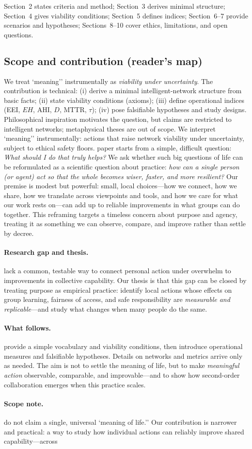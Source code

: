 \documentclass[12pt]{article}
\begin{document}
Section~2 states criteria and method; Section~3 derives minimal structure; Section~4 gives viability conditions; Section~5 defines indices; Section~6–7 provide scenarios and hypotheses; Sections~8–10 cover ethics, limitations, and open questions.\n \subsection*{Scope and contribution (reader's map)} We treat `meaning'' instrumentally as \emph{viability under uncertainty}. The contribution is technical: (i) derive a minimal intelligent-network structure from basic facts; (ii) state viability conditions (axioms); (iii) define operational indices (EEI, $EH$, AHI, $D$, MTTR, $\tau$); (iv) pose falsifiable hypotheses and study designs. Philosophical inspiration motivates the question, but claims are restricted to intelligent networks; metaphysical theses are out of scope. We interpret `meaning'' instrumentally: actions that raise network viability under uncertainty, subject to ethical safety floors. \nThis paper starts from a simple, difficult question: \emph{What should I do that truly helps?} We ask whether such big questions of life can be reformulated as a scientific question about practice: \emph{how can a single person (or agent) act so that the whole becomes wiser, faster, and more resilient?} Our premise is modest but powerful: small, local choices—how we connect, how we share, how we translate across viewpoints and tools, and how we care for what our work rests on—can add up to reliable improvements in what groups can do together. This reframing targets a timeless concern about purpose and agency, treating it as something we can observe, compare, and improve rather than settle by decree.\n\n\paragraph{Research gap and thesis.}\nWe lack a common, testable way to connect personal action under overwhelm to improvements in collective capability. Our thesis is that this gap can be closed by treating purpose as empirical practice: identify local actions whose effects on group learning, fairness of access, and safe responsibility are \emph{measurable and replicable}—and study what changes when many people do the same.\n\n\paragraph{What follows.}\nWe provide a simple vocabulary and viability conditions, then introduce operational measures and falsifiable hypotheses. Details on networks and metrics arrive only as needed. The aim is not to settle the meaning of life, but to make \emph{meaningful action} observable, comparable, and improvable—and to show how second-order collaboration emerges when this practice scales.\n\n\paragraph{Scope note.}\nWe do not claim a single, universal `meaning of life.'' Our contribution is narrower and practical: a way to study how individual actions can reliably improve shared capability—across 
\end{document}
